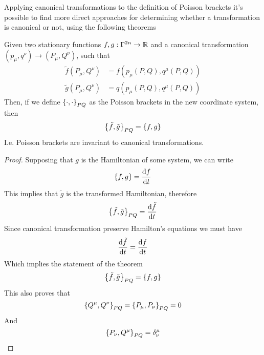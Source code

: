 \documentclass[../admech.tex]{subfiles}
\begin{document}
Applying canonical transformations to the definition of Poisson brackets it's possible to find more direct approaches for determining whether a transformation is canonical or not, using the following theorems
\begin{thm}
	Given two stationary functions $f,g:\Gamma^{2n}\to\operatorname{\mathbb{R}}$ and a canonical transformation $(p_\mu,q^\nu)\to(P_\mu,Q^\nu)$, such that
	\begin{equation*}
		\begin{aligned}
			\tilde{f}(P_\mu,Q^\nu)&=f\left( p_\mu(P,Q),q^\mu(P,Q) \right)\\
			\tilde{g}(P_\mu,Q^\nu)&=q\left( p_\mu(P,Q),q^\mu(P,Q) \right)
		\end{aligned}
	\end{equation*}
	Then, if we define $\left\{\cdot,\cdot\right\}_{PQ}$ as the Poisson brackets in the new coordinate system, then
	\begin{equation}
		\left\{\tilde{f},\tilde{g}\right\}_{PQ}=\left\{f,g\right\}
		\label{eq:canpoisson}
	\end{equation}
	I.e. Poisson brackets are invariant to canonical transformations.
\end{thm}
\begin{proof}
	Supposing that $g$ is the Hamiltonian of some system, we can write
	\begin{equation*}
		\left\{f,g\right\}=\dv{f}{t}
	\end{equation*}
	This implies that $\tilde{g}$ is the transformed Hamiltonian, therefore
	\begin{equation*}
		\left\{\tilde{f},\tilde{g}\right\}_{PQ}=\dv{\tilde{f}}{t}
	\end{equation*}
	Since canonical transformation preserve Hamilton's equations we must have
	\begin{equation*}
		\dv{\tilde{f}}{t}=\dv{f}{t}
	\end{equation*}
	Which implies the statement of the theorem
	\begin{equation*}
		\left\{\tilde{f},\tilde{g}\right\}_{PQ}=\left\{f,g\right\}
	\end{equation*}
	This also proves that
	\begin{equation*}
		\left\{Q^\mu,Q^\nu\right\}_{PQ}=\left\{P_\mu,P_\nu\right\}_{PQ}=0
	\end{equation*}
	And
	\begin{equation*}
		\left\{P_\nu,Q^\mu\right\}_{PQ}=\delta^\mu_\nu
	\end{equation*}
\end{proof}
\end{document}
